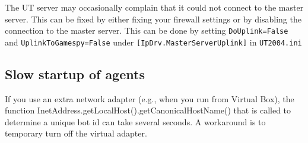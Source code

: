 \documentclass[11pt,a4paper]{article}
\begin{document}
The UT server may occasionally complain that it could not connect to the master server. This can be fixed by either fixing your firewall settings or by disabling the connection to the master server. This can be done by setting \verb|DoUplink=False| and  \verb|UplinkToGamespy=False| under \verb|[IpDrv.MasterServerUplink]| in \verb|UT2004.ini|

\subsection{Slow startup of agents}
If you use an extra network adapter (e.g., when you run from Virtual Box), the function InetAddress.getLocalHost().getCanonicalHostName() that is called to determine a unique bot id can take several seconds. A workaround is to temporary turn off the virtual adapter.



\end{document}
